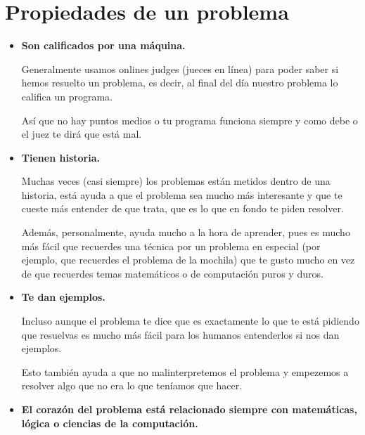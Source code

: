 \documentclass[12pt, fleqn]{report}                             %
\theoremstyle{break}                                            %
\begin{document}
        \clearpage
        \section{Propiedades de un problema}

            \begin{itemize}
                \item \textbf{Son calificados por una máquina.}

                    Generalmente usamos onlines judges (jueces en línea) para poder saber si hemos
                    resuelto un problema, es decir, al final del día nuestro problema lo califica 
                    un programa. 

                    Así que no hay puntos medios o tu programa funciona siempre y como debe o el juez
                    te dirá que está mal.

                \item \textbf{Tienen historia.}
                
                    Muchas veces (casi siempre) los problemas están metidos dentro de una historia,
                    está ayuda a que el problema sea mucho más interesante y que te cueste más entender de que
                    trata, que es lo que en fondo te piden resolver.

                    Además, personalmente, ayuda mucho a la hora de aprender, pues es mucho más fácil
                    que recuerdes una técnica por un problema en especial (por ejemplo, que recuerdes
                    el problema de la mochila) que te gusto mucho en vez de que recuerdes temas matemáticos o
                    de computación puros y duros.

                \item \textbf{Te dan ejemplos.}
                
                    Incluso aunque el problema te dice que es exactamente lo que te está pidiendo que resuelvas
                    es mucho más fácil para los humanos entenderlos si nos dan ejemplos.

                    Esto también ayuda a que no malinterpretemos el problema y empezemos a resolver
                    algo que no era lo que teníamos que hacer.

                \item \textbf{El corazón del problema está relacionado siempre con matemáticas, lógica o
                ciencias de la computación.}

            \end{itemize}
\end{document}
